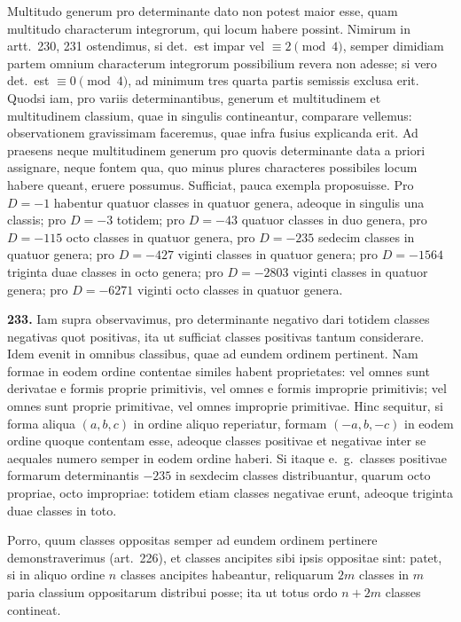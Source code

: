 \documentclass[12pt,a4paper]{article}
\theoremstyle{plain}
\theoremstyle{definition}
\theoremstyle{remark}
\begin{document}
Multitudo generum pro determinante dato non potest maior esse, quam multitudo characterum integrorum, qui locum habere possint. Nimirum in artt.\ 230, 231 ostendimus, si det.\ est impar vel $\equiv 2\pmod{4}$, semper dimidiam partem omnium characterum integrorum possibilium revera non adesse; si vero det.\ est $\equiv 0\pmod{4}$, ad minimum tres quarta partis semissis exclusa erit. Quodsi iam, pro variis determinantibus, generum et multitudinem et multitudinem classium, quae in singulis contineantur, comparare vellemus: observationem gravissimam faceremus, quae infra fusius explicanda erit. Ad praesens neque multitudinem generum pro quovis determinante data a priori assignare, neque fontem qua, quo minus plures characteres possibiles locum habere queant, eruere possumus. Sufficiat, pauca exempla proposuisse. Pro $D=-1$ habentur quatuor classes in quatuor genera, adeoque in singulis una classis; pro $D=-3$ totidem; pro $D=-43$ quatuor classes in duo genera, pro $D=-115$ octo classes in quatuor genera, pro $D=-235$ sedecim classes in quatuor genera; pro $D=-427$ viginti classes in quatuor genera; pro $D=-1564$ triginta duae classes in octo genera; pro $D=-2803$ viginti classes in quatuor genera; pro $D=-6271$ viginti octo classes in quatuor genera.

\textbf{233.}
Iam supra observavimus, pro determinante negativo dari totidem classes negativas quot positivas, ita ut sufficiat classes positivas tantum considerare. Idem evenit in omnibus classibus, quae ad eundem ordinem pertinent. Nam formae in eodem ordine contentae similes habent proprietates: vel omnes sunt derivatae e formis proprie primitivis, vel omnes e formis improprie primitivis; vel omnes sunt proprie primitivae, vel omnes improprie primitivae. Hinc sequitur, si forma aliqua $(a,b,c)$ in ordine aliquo reperiatur, formam $(-a,b,-c)$ in eodem ordine quoque contentam esse, adeoque classes positivae et negativae inter se aequales numero semper in eodem ordine haberi. Si itaque e.\ g.\ classes positivae formarum determinantis $-235$ in sexdecim classes distribuantur, quarum octo propriae, octo impropriae: totidem etiam classes negativae erunt, adeoque triginta duae classes in toto.

Porro, quum classes oppositas semper ad eundem ordinem pertinere demonstraverimus (art.\ 226), et classes ancipites sibi ipsis oppositae sint: patet, si in aliquo ordine $n$ classes ancipites habeantur, reliquarum $2m$ classes in $m$ paria classium oppositarum distribui posse; ita ut totus ordo $n+2m$ classes contineat.
\end{document}
